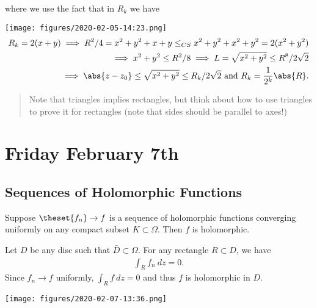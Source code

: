 \begin{description}
where we use the fact that in \(R_k\) we have

\texttt{[image: figures/2020-02-05-14:23.png]}\\

\begin{align*}
R_k = 2(x+y) \implies R^2/4 = x^2 + y^2 + x + y \leq_{CS} x^2 + y^2 + x^2 + y^2 = 2(x^2 + y^2) \\
\implies x^2 + y^2 \leq R^2 / 8 \implies L = \sqrt{x^2 + y^2} \leq R^8 /2\sqrt{2} \\
\implies \abs{z-z_0} \leq \sqrt{x^2+y^2} \leq R_k/2\sqrt{2} \text{ and } R_k = \frac 1 {2^k} \abs{R}
.\end{align*}

\begin{quote}
Note that triangles implies rectangles, but think about how to use
triangles to prove it for rectangles (note that sides should be parallel
to axes!)
\end{quote}
\end{description}

\hypertarget{friday-february-7th}{%
\section{Friday February 7th}\label{friday-february-7th}}

\hypertarget{sequences-of-holomorphic-functions}{%
\subsection{Sequences of Holomorphic
Functions}\label{sequences-of-holomorphic-functions}}

\begin{description}
\tightlist
\item[Theorem (The Uniform Limit of Holomorphic Functions is
Holomorphic)]
Suppose \(\theset{f_n}\to f\) is a sequence of holomorphic functions
converging uniformly on any compact subset \(K \subset \Omega\). Then
\(f\) is holomorphic.
\item[Proof]
Let \(D\) be any disc such that \(\bar D \subset \Omega\). For any
rectangle \(R \subset D\), we have
\begin{align*}\int_R f_n ~dz = 0.\end{align*} Since \(f_n \to f\)
uniformly, \(\int_R f ~dz = 0\) and thus \(f\) is holomorphic in \(D\).
\end{description}

\texttt{[image: figures/2020-02-07-13:36.png]}\\

